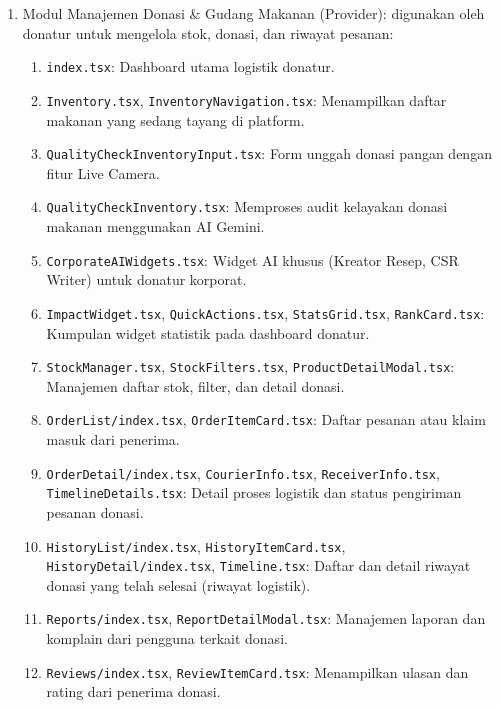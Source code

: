 \begin{enumerate}[label=\arabic*.]
    \item Modul Manajemen Donasi \& Gudang Makanan (Provider): digunakan oleh donatur untuk mengelola stok, donasi, dan riwayat pesanan:
    \begin{enumerate}[label=\alph*.]
        \item \texttt{index.tsx}: Dashboard utama logistik donatur.
        \item \texttt{Inventory.tsx}, \texttt{InventoryNavigation.tsx}: Menampilkan daftar makanan yang sedang tayang di platform.
        \item \texttt{QualityCheckInventoryInput.tsx}: Form unggah donasi pangan dengan fitur Live Camera.
        \item \texttt{QualityCheckInventory.tsx}: Memproses audit kelayakan donasi makanan menggunakan AI Gemini.
        \item \texttt{CorporateAIWidgets.tsx}: Widget AI khusus (Kreator Resep, CSR Writer) untuk donatur korporat.
        \item \texttt{ImpactWidget.tsx}, \texttt{QuickActions.tsx}, \texttt{StatsGrid.tsx}, \texttt{RankCard.tsx}: Kumpulan widget statistik pada dashboard donatur.
        \item \texttt{StockManager.tsx}, \texttt{StockFilters.tsx}, \texttt{ProductDetailModal.tsx}: Manajemen daftar stok, filter, dan detail donasi.
        \item \texttt{OrderList/index.tsx}, \texttt{OrderItemCard.tsx}: Daftar pesanan atau klaim masuk dari penerima.
        \item \texttt{OrderDetail/index.tsx}, \texttt{CourierInfo.tsx}, \texttt{ReceiverInfo.tsx}, \texttt{TimelineDetails.tsx}: Detail proses logistik dan status pengiriman pesanan donasi.
        \item \texttt{HistoryList/index.tsx}, \texttt{HistoryItemCard.tsx}, \texttt{HistoryDetail/index.tsx}, \texttt{Timeline.tsx}: Daftar dan detail riwayat donasi yang telah selesai (riwayat logistik).
        \item \texttt{Reports/index.tsx}, \texttt{ReportDetailModal.tsx}: Manajemen laporan dan komplain dari pengguna terkait donasi.
        \item \texttt{Reviews/index.tsx}, \texttt{ReviewItemCard.tsx}: Menampilkan ulasan dan rating dari penerima donasi.
    \end{enumerate}


\end{enumerate}
